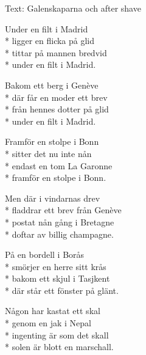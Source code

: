 \begin{SongText}
    \begin{SongInfo}
        Text: Galenskaparna och after shave
    \end{SongInfo}
    \begin{SongVerse}
        Under en filt i Madrid\\*%
        ligger en flicka på glid\\*%
        tittar på mannen bredvid\\*%
        under en filt i Madrid.
    \end{SongVerse}
    \begin{SongVerse}
        Bakom ett berg i Genève\\*%
        där får en moder ett brev\\*%
        från hennes dotter på glid\\*%
        under en filt i Madrid.
    \end{SongVerse}
    \begin{SongVerse}
        Framför en stolpe i Bonn\\*%
        sitter det nu inte nån\\*%
        endast en tom La Garonne\\*%
        framför en stolpe i Bonn.
    \end{SongVerse}
    \begin{SongVerse}
        Men där i vindarnas drev\\*%
        fladdrar ett brev från Genève\\*%
        postat nån gång i Bretagne\\*%
        doftar av billig champagne.
    \end{SongVerse}
    \begin{SongVerse}
        På en bordell i Borås\\*%
        smörjer en herre sitt krås\\*%
        bakom ett skjul i Tasjkent\\*%
        där står ett fönster på glänt.
    \end{SongVerse}
    \begin{SongVerse}
        Någon har kastat ett skal\\*%
        genom en jak i Nepal\\*%
        ingenting är som det skall\\*%
        solen är blott en marschall.
    \end{SongVerse}
    \begin{SongVerse}

\end{SongVerse}
\end{SongText}
